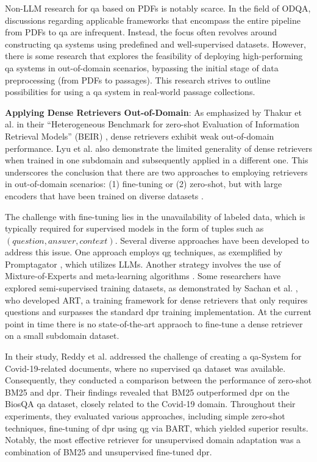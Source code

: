Non-LLM research for \gls{qa} based on PDFs is notably scarce. In the field of ODQA, discussions regarding applicable frameworks that encompass the entire pipeline from PDFs to \gls{qa} are infrequent. Instead, the focus often revolves around constructing \gls{qa} systems using predefined and well-supervised datasets. However, there is some research that explores the feasibility of deploying high-performing \gls{qa} systems in out-of-domain scenarios, bypassing the initial stage of data preprocessing (from PDFs to passages). This research strives to outline possibilities for using a \gls{qa} system in real-world passage collections.

\noindent \textbf{Applying Dense Retrievers Out-of-Domain}: As emphasized by Thakur et al. in their \enquote{Heterogeneous Benchmark for zero-shot Evaluation of Information Retrieval Models} (BEIR) \cite{thakur_beir_2021}, dense retrievers exhibit weak out-of-domain performance. Lyu et al. \cite{farea_evaluation_2022} also demonstrate the limited generality of dense retrievers when trained in one subdomain and subsequently applied in a different one. This underscores the conclusion that there are two approaches to employing retrievers in out-of-domain scenarios: (1) fine-tuning or (2) zero-shot, but with large encoders that have been trained on diverse datasets \cite{ni_large_2021}.

The challenge with fine-tuning lies in the unavailability of labeled data, which is typically required for supervised models in the form of tuples such as $(question, answer, context)$. Several diverse approaches have been developed to address this issue. One approach employs \gls{qg} techniques, as exemplified by Promptagator \cite{dai_promptagator_2022}, which utilizes LLMs. Another strategy involves the use of Mixture-of-Experts and meta-learning algorithms \cite{chen_improving_2021}. Some researchers have explored semi-supervised training datasets, as demonstrated by Sachan et al. \cite{sachan_questions_2023}, who developed ART, a training framework for dense retrievers that only requires questions and surpasses the standard \gls{dpr} training implementation. At the current point in time there is no state-of-the-art appraoch to fine-tune a dense retriever on a small subdomain dataset.

In their study, Reddy et al. \cite{reddy_synthetic_2022} addressed the challenge of creating a \gls{qa}-System for Covid-19-related documents, where no supervised \gls{qa} dataset was available. Consequently, they conducted a comparison between the performance of zero-shot BM25 and \gls{dpr}. Their findings revealed that BM25 outperformed \gls{dpr} on the BiosQA \gls{qa} dataset, closely related to the Covid-19 domain. Throughout their experiments, they evaluated various approaches, including simple zero-shot techniques, fine-tuning of \gls{dpr} using \gls{qg} via BART, which yielded superior results. Notably, the most effective retriever for unsupervised domain adaptation was a combination of BM25 and unsupervised fine-tuned \gls{dpr}.

